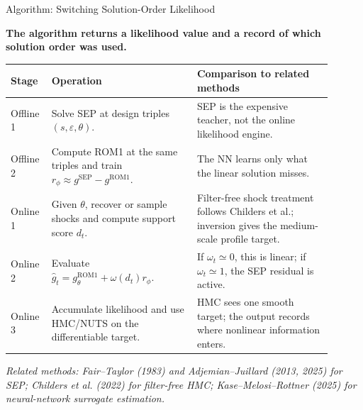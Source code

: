 \documentclass[aspectratio=169,10pt]{beamer}
\newcommand{\sep}{\mathrm{SEP}}
\newcommand{\rom}{\mathrm{ROM1}}
\newcommand{\eps}{\varepsilon}
\newcommand{\state}{s}
\newcommand{\sourcefoot}[1]{%
  \vspace{-0.55em}
  \begin{flushleft}
  \parbox{0.96\linewidth}{\raggedright\tiny\textit{#1}}
  \end{flushleft}
}
\newcommand{\claim}[1]{%
  \begin{center}
  \parbox{0.94\linewidth}{\centering\large\bfseries #1}
  \end{center}
}
\begin{document}
\begin{frame}{Algorithm: Switching Solution-Order Likelihood}
\claim{The algorithm returns a likelihood value and a record of which solution order was used.}

\vspace{0.15em}
\scriptsize
\begin{table}
\centering
\begin{tabular}{@{}p{0.09\linewidth}p{0.42\linewidth}p{0.39\linewidth}@{}}
\toprule
Stage & Operation & Comparison to related methods \\
\midrule
Offline 1 & Solve SEP at design triples \((\state,\eps,\theta)\). & SEP is the expensive teacher, not the online likelihood engine. \\
Offline 2 & Compute ROM1 at the same triples and train \(r_\phi\approx g^\sep-g^\rom\). & The NN learns only what the linear solution misses. \\
Online 1 & Given \(\theta\), recover or sample shocks and compute support score \(d_t\). & Filter-free shock treatment follows Childers et al.; inversion gives the medium-scale profile target. \\
Online 2 & Evaluate \(\widehat g_t=g^\rom_\theta+\omega(d_t)r_\phi\). & If \(\omega_t\simeq0\), this is linear; if \(\omega_t\simeq1\), the SEP residual is active. \\
Online 3 & Accumulate likelihood and use HMC/NUTS on the differentiable target. & HMC sees one smooth target; the output records where nonlinear information enters. \\
\bottomrule
\end{tabular}
\end{table}

\sourcefoot{Related methods: Fair--Taylor (1983) and Adjemian--Juillard (2013, 2025) for SEP; Childers et al. (2022) for filter-free HMC; Kase--Melosi--Rottner (2025) for neural-network surrogate estimation.}
\end{frame}
\end{document}
